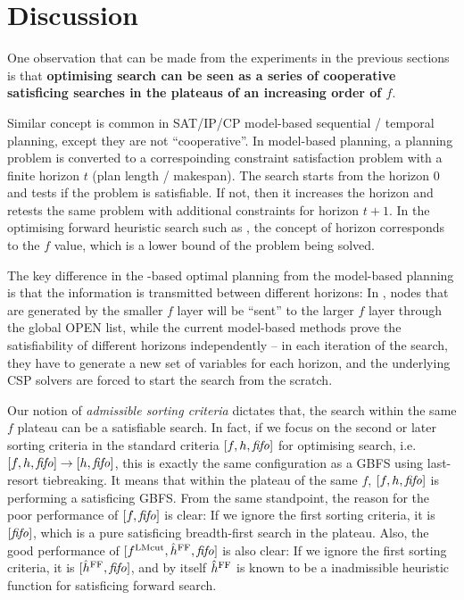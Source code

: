 \clearpage 
\section{Discussion}
\label{sec:discussion}

One observation that can be made from the experiments in the previous
sections is that \textbf{optimising search can be seen as a series of
cooperative satisficing searches in the plateaus of an increasing order
of $f$}.

Similar concept is common in SAT/IP/CP model-based sequential / temporal
planning, except they are not ``cooperative''. In model-based
planning, a planning problem is converted to a correspoinding constraint
satisfaction problem with a finite horizon $t$ (plan length /
makespan). The search starts from the horizon 0
and tests if the problem is satisfiable. If not, then it increases the
horizon and retests the same problem with additional constraints for
horizon $t+1$. In the optimising forward heuristic search such as
\astar, the concept of horizon corresponds to the $f$ value, which is a
lower bound of the problem being solved.

The key difference in the \astar-based optimal planning from the model-based planning is
that the information is transmitted between different horizons:
In \astar, nodes that are generated by the smaller
$f$ layer will be ``sent'' to the larger $f$ layer through the global OPEN
list, while the current model-based methods prove the satisfiability of
different horizons independently -- in each iteration of the search,
they have to generate a new set of variables for each horizon, and the
underlying CSP solvers are forced to start the search from the scratch.

Our notion of \emph{admissible sorting criteria} dictates that, the
search within the same $f$ plateau can be a satisfiable search. In fact,
if we focus on the second or later sorting criteria in the standard criteria
$[f,h,{\text{\textit{fifo}}}]$ for optimising search, i.e. $[f,h,{\text{\textit{fifo}}}] \rightarrow [h,{\text{\textit{fifo}}}]$, this is exactly
the same configuration as a GBFS using \fifo last-resort tiebreaking. It
means that within the plateau of the same $f$, $[f,h,{\text{\textit{fifo}}}]$ is
performing a satisficing GBFS.
From the same standpoint, the reason for the poor performance of $[f,{\text{\textit{fifo}}}]$
is clear: If we ignore the first sorting criteria, it is $[{\text{\textit{fifo}}}]$,
which is a pure satisficing breadth-first search in the plateau.
Also, the good performance of $[f^{\text{LMcut}},\hat{h}^{\text{FF}},{\text{\textit{fifo}}}]$ is also clear:
If we ignore the first sorting criteria, it is $[\hat{h}^{\text{FF}},{\text{\textit{fifo}}}]$,
and by itself $\hat{h}^{\text{FF}}$ is known to be a \sota inadmissible heuristic
function for satisficing forward search.

